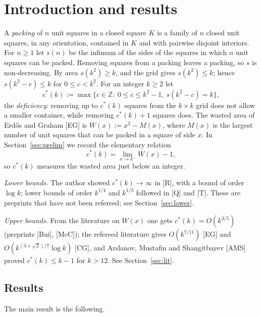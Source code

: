 \documentclass[11pt]{amsart}
\newcommand{\Z}{\mathbb Z}
\newcommand{\cs}{c^{*}}
\theoremstyle{definition}
\theoremstyle{remark}
\numberwithin{equation}{section}
\begin{document}
\section{Introduction and results}\label{sec:intro}

A \emph{packing} of $n$ unit squares in a closed square $K$ is a family of $n$ closed unit squares, in any orientation,
contained in $K$ and with pairwise disjoint interiors. For $n\ge1$ let $s(n)$ be the infimum of the sides of the squares
in which $n$ unit squares can be packed. Removing squares from a packing leaves a packing, so $s$ is non-decreasing.
By area $s(k^2)\ge k$, and the grid gives $s(k^2)\le k$; hence $s(k^2-c)\le k$ for $0\le c<k^2$. For an integer $k\ge2$
let
\[
\cs(k):=\max\{c\in\Z:\ 0\le c\le k^2-1,\ s(k^2-c)=k\},
\]
the \emph{deficiency}: removing up to $\cs(k)$ squares from the $k\times k$ grid does not allow a smaller container,
while removing $\cs(k)+1$ squares does. The wasted area of Erd\H{o}s and Graham [EG] is $W(x):=x^2-M(x)$, where $M(x)$ is
the largest number of unit squares that can be packed in a square of side $x$. In Section~\ref{sec:prelim} we record
the elementary relation
\begin{equation}\label{eq:translation}
\cs(k)=\lim_{x\to k^-}W(x)-1 ,
\end{equation}
so $\cs(k)$ measures the wasted area just below an integer.

\emph{Lower bounds.} The author showed $\cs(k)\to\infty$ in [R], with a bound of order $\log k$; lower bounds of
order $k^{1/4}$ and $k^{1/3}$ followed in [Q] and [T]. These are preprints that have not been refereed; see
Section~\ref{sec:lower}.

\emph{Upper bounds.} From the literature on $W(x)$ one gets $\cs(k)=O(k^{3/5})$ (preprints [Bui], [McC]); the refereed
literature gives $O(k^{7/11})$ [EG] and $O(k^{(3+\sqrt2)/7}\log k)$ [CG], and Arslanov, Mustafin and Shangitbayev
[AMS] proved $\cs(k)\le k-1$ for $k>12$. See Section~\ref{sec:lit}.

\subsection{Results}
The main result is the following.
\end{document}
